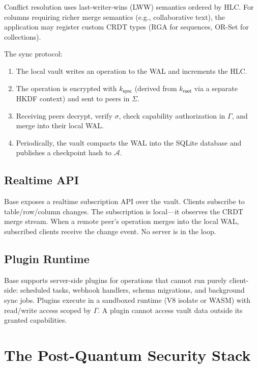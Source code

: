 \documentclass[11pt,a4paper]{article}
\begin{document}
Conflict resolution uses last-writer-wins (LWW) semantics ordered by HLC.
For columns requiring richer merge semantics (e.g., collaborative text), the
application may register custom CRDT types (RGA for sequences, OR-Set for
collections).

The sync protocol:

\begin{enumerate}[nosep]
  \item The local vault writes an operation to the WAL and increments the HLC.
  \item The operation is encrypted with $k_{\mathsf{sync}}$ (derived from
        $k_{\mathsf{root}}$ via a separate HKDF context) and sent to peers
        in $\Sigma$.
  \item Receiving peers decrypt, verify $\sigma$, check capability authorization
        in $\Gamma$, and merge into their local WAL.
  \item Periodically, the vault compacts the WAL into the SQLite database and
        publishes a checkpoint hash to $\mathcal{A}$.
\end{enumerate}

\subsection{Realtime API}

Base exposes a realtime subscription API over the vault. Clients subscribe to
table/row/column changes. The subscription is local---it observes the CRDT merge
stream. When a remote peer's operation merges into the local WAL, subscribed
clients receive the change event. No server is in the loop.

\subsection{Plugin Runtime}

Base supports server-side plugins for operations that cannot run purely
client-side: scheduled tasks, webhook handlers, schema migrations, and
background sync jobs. Plugins execute in a sandboxed runtime (V8 isolate or
WASM) with read/write access scoped by $\Gamma$. A plugin cannot access vault
data outside its granted capabilities.

\section{The Post-Quantum Security Stack}\label{sec:pq}
\end{document}
